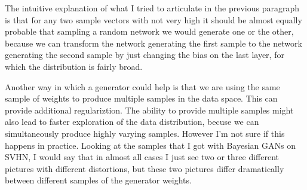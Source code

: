 \documentclass[11pt]{article}
\begin{document}
The intuitive explanation of what I tried to articulate in the previous paragraph
is that for any two sample vectors with not very high it should be almost equally probable
that sampling a random network we would generate one or the other, because we 
can transform the network generating the first sample to the network generating
the second sample by just changing the bias on the last layer, for which the
distribution is fairly broad.

Another way in which a generator could help is that we are using the same sample
of weights to produce multiple samples in the data space. This can provide 
additional regulariztion. The ability
to provide multiple samples might also lead to faster exploration of the data
distribution, becuse we can simultaneously produce highly varying samples.
However I'm not sure if this happens in practice. Looking at the samples that
I got with Bayesian GANs on SVHN, I would say that in almost all cases I just
see two or three different pictures with different distortions, but these
two pictures differ dramatically between different samples of the generator
weights.



\end{document}

